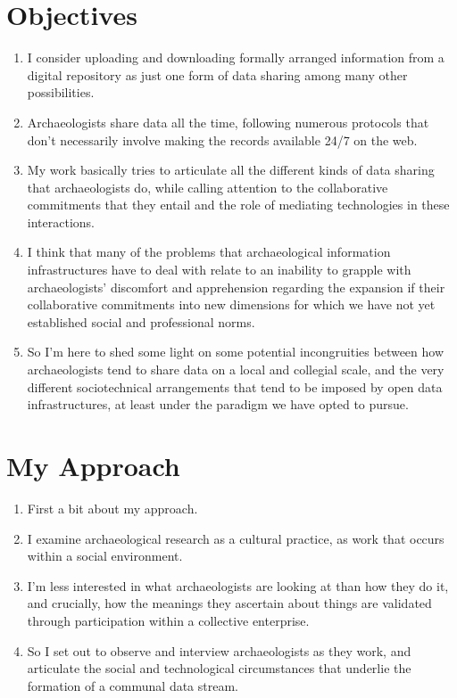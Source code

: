 \documentclass{article}
\begin{document}
\section{Objectives}
\begin{enumerate}
  \item I consider uploading and downloading formally arranged information from a digital repository as just one form of data sharing among many other possibilities.
  \item Archaeologists share data all the time, following numerous protocols that don't necessarily involve making the records available 24/7 on the web.
  \item My work basically tries to articulate all the different kinds of data sharing that archaeologists do, while calling attention to the collaborative commitments that they entail and the role of mediating technologies in these interactions.
  \item I think that many of the problems that archaeological information infrastructures have to deal with relate to an inability to grapple with archaeologists' discomfort and apprehension regarding the expansion if their collaborative commitments into new dimensions for which we have not yet established social and professional norms.
  \item So I'm here to shed some light on some potential incongruities between how archaeologists tend to share data on a local and collegial scale, and the very different sociotechnical arrangements that tend to be imposed by open data infrastructures, at least under the paradigm we have opted to pursue.
\end{enumerate}

\section{My Approach}
\begin{enumerate}
  \item First a bit about my approach.
  \item I examine archaeological research as a cultural practice, as work that occurs within a social environment.
  \item I'm less interested in what archaeologists are looking at than how they do it, and crucially, how the meanings they ascertain about things are validated through participation within a collective enterprise.
  \item So I set out to observe and interview archaeologists as they work, and articulate the social and technological circumstances that underlie the formation of a communal data stream.
\end{enumerate}
\end{document}
